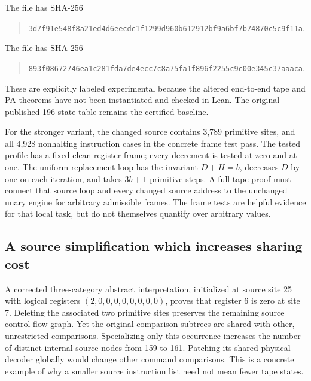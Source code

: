 \documentclass[11pt,a4paper]{article}
\begin{document}
\begin{samepage}
The file  has SHA-256
\begin{quote}\small
\nolinkurl{3d7f91e548f8a21ed4d6eecdc1f1299d960b612912bf9a6bf7b74870c5c9f11a}.
\end{quote}
\end{samepage}
\begin{samepage}
The file  has SHA-256
\begin{quote}\small
\nolinkurl{893f08672746ea1c281fda7de4ecc7c8a75fa1f896f2255c9c00e345c37aaaca}.
\end{quote}
\end{samepage}
These are explicitly labeled experimental because the altered end-to-end
tape and PA theorems have not been instantiated and checked in Lean.
The original published 196-state table remains the certified baseline.

For the stronger variant, the changed source contains 3,789 primitive
sites, and all 4,928 nonhalting instruction cases in the concrete frame
test pass. The tested profile has a fixed clean register frame; every
decrement is tested at zero and at one. The uniform replacement loop has
the invariant $D+H=b$, decreases $D$ by one on each iteration, and takes
$3b+1$ primitive steps. A full tape proof must connect that source loop
and every changed source address to the unchanged unary engine for
arbitrary admissible frames. The frame tests are helpful evidence for
that local task, but do not themselves quantify over arbitrary values.

\subsection{A source simplification which increases sharing cost}

A corrected three-category abstract interpretation, initialized at source
site 25 with logical registers $(2,0,0,0,0,0,0,0,0)$, proves that register
6 is zero at site 7. Deleting the associated two primitive sites preserves
the remaining source control-flow graph. Yet the original comparison
subtrees are shared with other, unrestricted comparisons. Specializing
only this occurrence increases the number of distinct internal source
nodes from 159 to 161. Patching its shared physical decoder globally
would change other command comparisons. This is a concrete example of
why a smaller source instruction list need not mean fewer tape states.
\end{document}
